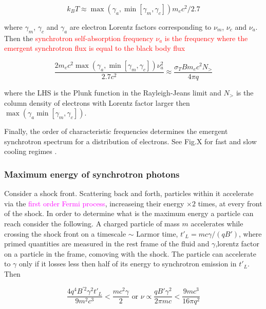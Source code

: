 \documentclass[11pt,a4paper,headinclude=true,DIV=14,BCOR=8mm,chapterprefix,listof=totoc,twoside,openright,abstracton]{scrbook}
\newcommand{\red}[1]{\textcolor{red}{#1}}
\newcommand{\magenta}[1]{\textcolor{magenta}{#1}} %
\begin{document}
\begin{equation}
    k_BT\approx \max(\gamma_a,\min[\gamma_m,\gamma_c])m_e c^2 / 2.7
\end{equation}

where $\gamma_m$, $\gamma_c$ and $\gamma_a$ are electron Lorentz factors corresponding to $\nu_m$, $\nu_c$ and $\nu_a$.
Then the \red{synchrotron self-absorption frequency $\nu_a$ is the frequency where the emergent synchrotron flux is equal to the black body flux}

\begin{equation}
    \frac{2m_ec^2\max(\gamma_a,\min[\gamma_m,\gamma_c])\nu_a^2}{2.7c^2}\approx\frac{\sigma_T B m_e c^2 N_>}{4 \pi q}
\end{equation}

where the LHS is the Plunk function in the Rayleigh-Jeans limit and $N_{>}$ is the column density of electrons with Lorentz factor larger then $\max(\gamma_a\min[\gamma_m,\gamma_c])$.


Finally, the order of characteristic frequencies determines the emergent synchrotron spectrum for a distribution of electrons. 
See Fig.X for fast and slow cooling regimes \cite{Sari et al 1998}.


\subsubsection{Maximum energy of synchrotron photons}

Consider a shock front. Scattering back and forth, particles within it accelerate via the \magenta{first order Fermi process}, increaseing their energy $\times 2$ times, at every front of the shock.
In order to determine what is the maximum energy a particle can reach consider the following. A charged particle of mass $m$ accelerates while crossing the shock front on a timescale $\sim$ Larmor time, $t'_L = mc\gamma/(qB')$, where primed quantities are measured in the rest frame of the fluid and $\gamma$,lorentz factor on a particle in the frame, comoving with the shock. 
The particle can accelerate to $\gamma$ only if it losses less then half of its energy to synchrotron emission in $t'_L$. Then 

\begin{equation}
    \frac{4 q^4 B^{'2}\gamma^2 t'_L}{9 m^2 c^3} < \frac{m c^2\gamma}{2} \text{ or } \nu\propto \frac{q B' \gamma^2}{2\pi m c} < \frac{9 m c^3}{16\pi q^2}
\end{equation}
\end{document}
